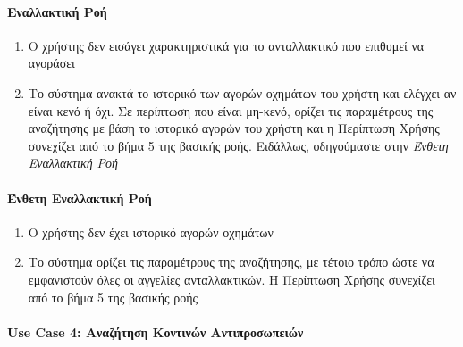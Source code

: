 \documentclass{../ol-softwaremanual}
\begin{document}
	\paragraph{Εναλλακτική Ροή}
	
	\begin{enumerate}
		\item Ο χρήστης δεν εισάγει χαρακτηριστικά για το ανταλλακτικό που επιθυμεί να αγοράσει
		\item Το σύστημα ανακτά το ιστορικό των αγορών οχημάτων του χρήστη και ελέγχει αν είναι κενό ή όχι. Σε περίπτωση που είναι μη-κενό, ορίζει τις παραμέτρους της αναζήτησης με βάση το ιστορικό αγορών του χρήστη και η Περίπτωση Χρήσης συνεχίζει από το βήμα 5 της βασικής ροής. Ειδάλλως, οδηγούμαστε στην \textit{Ένθετη Εναλλακτική Ροή}
		
	\end{enumerate}
	
	\paragraph{Ένθετη Εναλλακτική Ροή}
	\begin{enumerate}
		\item Ο χρήστης δεν έχει ιστορικό αγορών οχημάτων
		\item Το σύστημα ορίζει τις παραμέτρους της αναζήτησης, με τέτοιο τρόπο ώστε να εμφανιστούν όλες οι αγγελίες ανταλλακτικών. Η Περίπτωση Χρήσης συνεχίζει από το βήμα 5 της βασικής ροής
	\end{enumerate}
	
	
	\paragraph{\en Use Case 4: \gr Αναζήτηση Κοντινών Αντιπροσωπειών}	
	
\end{document}
